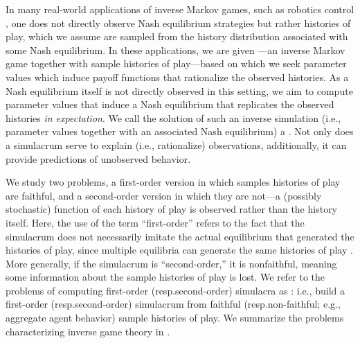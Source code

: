 In many real-world applications of inverse Markov games, such as robotics control \citep{coates2009apprenticeship}, one does not directly observe Nash equilibrium strategies but rather histories of play, which we assume are sampled from the history distribution associated with some Nash equilibrium. 
In these applications, we are given ---an inverse Markov game together with sample histories of play---based on which we seek parameter values which induce payoff functions that rationalize the observed histories. 
As a Nash equilibrium itself is not directly observed in this setting, we aim to compute parameter values that induce a Nash equilibrium that replicates the observed histories \emph{in expectation}.
We call the solution of such an inverse simulation (i.e., parameter values together with an associated Nash equilibrium) a .
Not only does a simulacrum serve to explain (i.e., rationalize) observations, additionally, it can provide predictions of unobserved behavior.

We study two  problems, a first-order version in which samples histories of play are faithful, and a second-order version in which they are not---a (possibly stochastic) function of each history of play is observed rather than the history itself.
Here, the use of the term ``first-order'' refers to the fact that the simulacrum does not necessarily imitate the actual equilibrium that generated the histories of play, 
since multiple equilibria can generate the same histories of play \citep{baudrillard1994simulacra}.
More generally, if the simulacrum is ``second-order,'' it is nonfaithful, meaning some information about the sample histories of play is lost.
We refer to the problems of computing first-order (resp.\@ second-order) simulacra as : i.e., build a first-order (resp.\@ second-order) simulacrum from faithful (resp.\@ non-faithful; e.g., aggregate agent behavior) sample histories of play.
%
We summarize the problems characterizing inverse game theory in .


